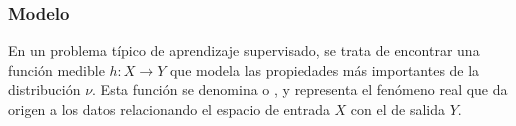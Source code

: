 %
\subsubsection{Modelo}
%
En un problema típico de aprendizaje supervisado, se trata de
encontrar una función medible $h:X\rightarrow{}Y$ que {modela} las
propiedades más importantes de la distribución $\nu$. Esta función
se denomina  o , y representa el
fenómeno real que da origen a los datos relacionando el espacio de
entrada $X$ con el de salida $Y$.
